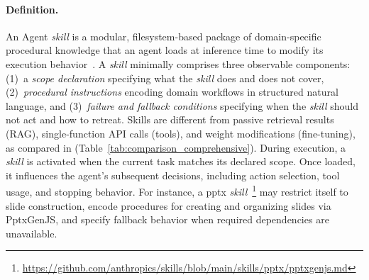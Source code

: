 \documentclass[sigconf,nonacm]{acmart}
\begin{document}
\paragraph{Definition.} An Agent \emph{skill} is a modular, filesystem-based package of domain-specific procedural knowledge that an agent loads at inference time to modify its execution behavior~\cite{xuyan2026survey}. A \emph{skill} minimally comprises three observable components: (1)~a \emph{scope declaration} specifying what the \emph{skill} does and does not cover, (2)~\emph{procedural instructions} encoding domain workflows in structured natural language, and (3)~\emph{failure and fallback conditions} specifying when the \emph{skill} should not act and how to retreat. Skills are different from passive retrieval results (RAG), single-function API calls (tools), and weight modifications (fine-tuning), as compared in (Table~\ref{tab:comparison_comprehensive}).  During execution, a \emph{skill} is activated when the current task matches its declared scope. Once loaded, it influences the agent's subsequent decisions, including action selection, tool usage, and stopping behavior. For instance, a pptx \emph{skill}~\footnote{\url{https://github.com/anthropics/skills/blob/main/skills/pptx/pptxgenjs.md}} may restrict itself to slide construction, encode procedures for creating and organizing slides via PptxGenJS, and specify fallback behavior when required dependencies are unavailable.




\end{document}
